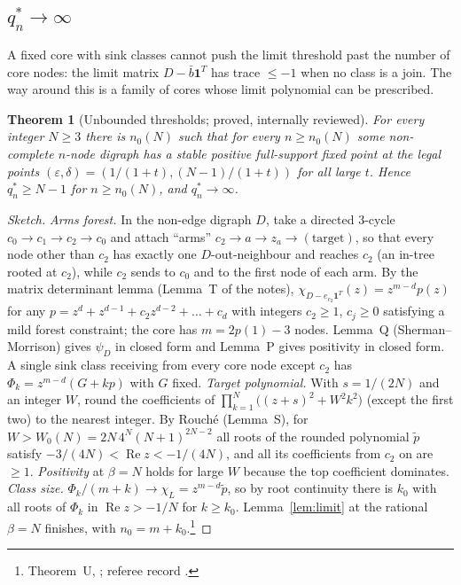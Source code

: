 \documentclass[11pt]{article}
\newtheorem{theorem}{Theorem}[section]
\theoremstyle{definition}
\newcommand{\one}{\mathbf{1}}
\newcommand{\eps}{\varepsilon}
\newcommand{\Rea}{\operatorname{Re}}
\begin{document}
{\subsection{\texorpdfstring{$q_n^*\to\infty$}{q*_n -> infinity}}
A fixed core with sink classes cannot push the limit threshold past the number of core nodes: the limit matrix
$D-\bar b\one^T$ has trace $\le-1$ when no class is a join. The way around this is a family of cores whose limit polynomial can be
prescribed.

\begin{theorem}[Unbounded thresholds; proved, internally reviewed]\label{thm:U}
For every integer $N\ge3$ there is $n_0(N)$ such that for every $n\ge n_0(N)$ some non-complete $n$-node digraph has a stable
positive full-support fixed point at the legal points $(\eps,\delta)=(1/(1+t),(N-1)/(1+t))$ for all large $t$. Hence
$q_n^*\ge N-1$ for $n\ge n_0(N)$, and $q_n^*\to\infty$.
\end{theorem}
\begin{proof}[Sketch]
\emph{Arms forest.} In the non-edge digraph $D$, take a directed $3$-cycle $c_0\to c_1\to c_2\to c_0$ and attach ``arms'' $c_2\to a\to z_a\to(\text{target})$,
so that every node other than $c_2$ has exactly one $D$-out-neighbour and reaches $c_2$ (an in-tree rooted at $c_2$), while $c_2$
sends to $c_0$ and to the first node of each arm. By the matrix determinant lemma (Lemma~T of the
notes), $\chi_{D-e_{c_2}\one^T}(z)=z^{m-d}p(z)$ for any $p=z^d+z^{d-1}+c_2z^{d-2}+\dots+c_d$ with integers $c_2\ge1$, $c_j\ge0$
satisfying a mild forest constraint; the core has $m=2p(1)-3$ nodes. Lemma~Q (Sherman--Morrison) gives $\psi_D$ in closed form and
Lemma~P gives positivity in closed form. A single sink class receiving from every core node except $c_2$ has
$\Phi_k=z^{m-d}(G+kp)$ with $G$ fixed.
\emph{Target polynomial.} With $s=1/(2N)$ and an integer $W$, round the coefficients of
$\prod_{k=1}^N\bigl((z+s)^2+W^2k^2\bigr)$ (except the first two) to the nearest integer. By Rouch\'e (Lemma~S), for
$W>W_0(N)=2N\,4^N(N+1)^{2N-2}$ all roots of the rounded polynomial $\tilde p$ satisfy $-3/(4N)<\Rea z<-1/(4N)$, and all its
coefficients from $c_2$ on are $\ge1$.
\emph{Positivity} at $\beta=N$ holds for large $W$ because the top coefficient dominates.
\emph{Class size.} $\Phi_k/(m+k)\to\chi_L=z^{m-d}\tilde p$, so by root continuity there is $k_0$ with all roots of $\Phi_k$ in
$\Rea z>-1/N$ for $k\ge k_0$. Lemma~\ref{lem:limit} at the rational $\beta=N$ finishes, with $n_0=m+k_0$.\footnote{Theorem~U, ; referee record .}

\end{proof}}
\end{document}
